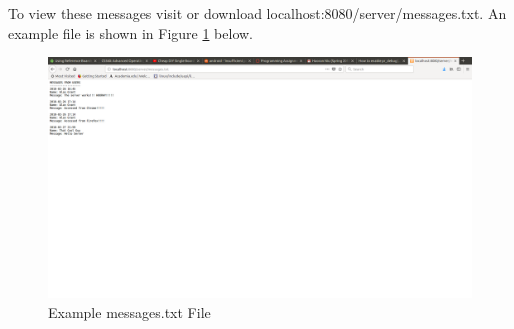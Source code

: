 \documentclass{article}
\begin{document}
	

	To view these messages visit or download localhost:8080/server/messages.txt. An example file is shown in Figure \ref{fig:messages} below.

	\begin{figure}[H]
		\includegraphics[width=\textwidth]{messages.png}
		\centering
		\caption{Example messages.txt File}
		\label{fig:messages}
	\end{figure}
\end{document}
